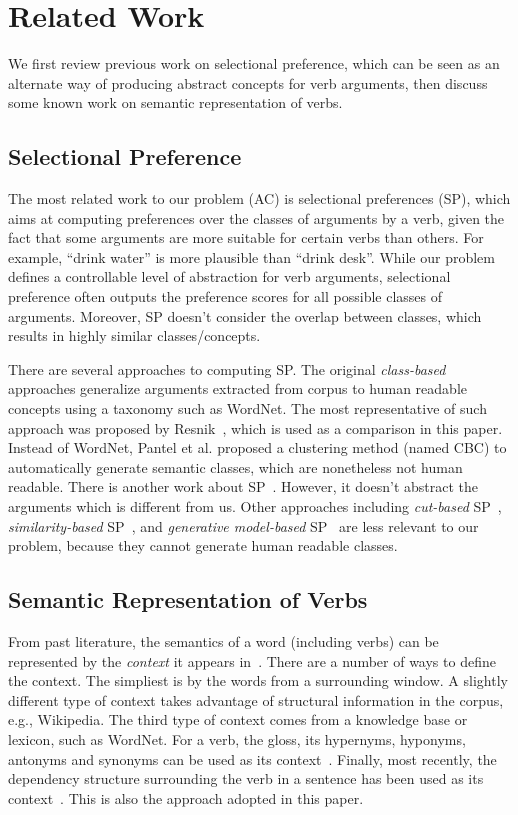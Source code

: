 \section{Related Work}
\label{sec:related}
We first review previous work on selectional preference,
which can be seen as an alternate way of
producing abstract concepts for verb arguments, then discuss
some known work on semantic representation of verbs.

\subsection{Selectional Preference}
The most related work to our problem (AC) is
selectional preferences (SP), which
aims at computing preferences over the classes of arguments by a verb,
given the fact that some arguments are more
suitable for certain verbs than others. For example,
``drink water'' is more plausible than ``drink desk''.
While our problem defines a controllable level of abstraction
for verb arguments, selectional preference
often outputs the preference scores for all possible classes of
arguments.  Moreover, SP doesn't consider the overlap between classes,
which results in highly similar classes/concepts.

There are several approaches to computing SP.
The original {\em class-based} approaches
generalize arguments extracted from corpus to human readable
concepts using a taxonomy such as WordNet.
The most representative of such approach was proposed
by Resnik~,
which is used as a comparison in this paper.
Instead of WordNet,
Pantel et al.
proposed a clustering method (named CBC) to
automatically generate semantic classes, which are nonetheless
not human readable.
There is another work about SP~\cite{fei2015illinois}. However,
it doesn't abstract the arguments which is different from us.
Other approaches including {\em cut-based} SP~\cite{li1998generalizing},
{\em similarity-based} SP~\cite{clark2001class,erk2007simple},
and {\em generative model-based} SP~\cite{ritter2010latent}
are less relevant to our problem,
because they cannot generate human readable classes.

\subsection{Semantic Representation of Verbs}
From past literature, the semantics of a word (including verbs) can be
represented by the {\em context} it appears in~\cite{mikolov2013efficient,mikolov2013distributed,mikolov2013linguistic,levy2014dependencybased}.
There are a number of ways to define the context. The simpliest is by the
words from a surrounding window.
A slightly different type of context takes advantage of structural information
in the corpus, e.g., Wikipedia. The third type of context comes from
a knowledge base or lexicon,
such as WordNet. For a verb, the gloss, its hypernyms, hyponyms, antonyms and
synonyms can be used as its context~\cite{meyer2012exhibit,yang2006verb}.
Finally, most recently, the dependency structure surrounding the verb in a
sentence has been used as its context~\cite{levy2014dependencybased}.
This is also the approach adopted in this paper.


